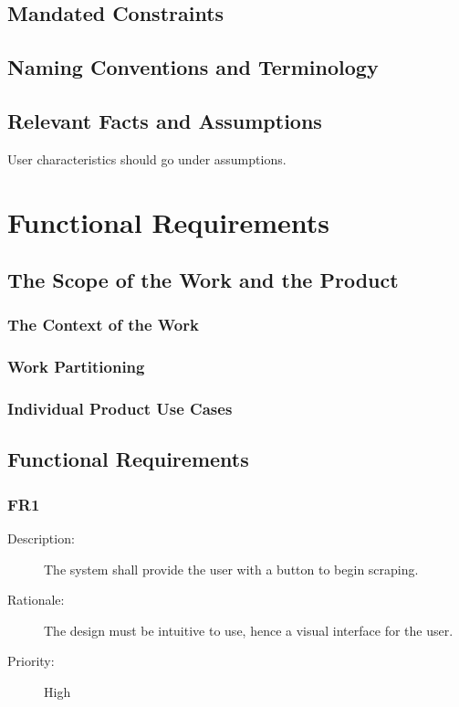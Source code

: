 \documentclass[12pt, titlepage]{article}
\begin{document}
\subsection{Mandated Constraints}

\subsection{Naming Conventions and Terminology}

\subsection{Relevant Facts and Assumptions}

User characteristics should go under assumptions.


\section{Functional Requirements}

\subsection{The Scope of the Work and the Product}

\subsubsection{The Context of the Work}

\subsubsection{Work Partitioning}

\subsubsection{Individual Product Use Cases}

\subsection{Functional Requirements}

\subsubsection{FR1}

\begin{description}
  \item[Description:] The system shall provide the user with a button to begin scraping. 
  \item[Rationale:] The design must be intuitive to use, hence a visual interface for the user. 
  \item[Priority:] High
\end{description}
\end{document}
